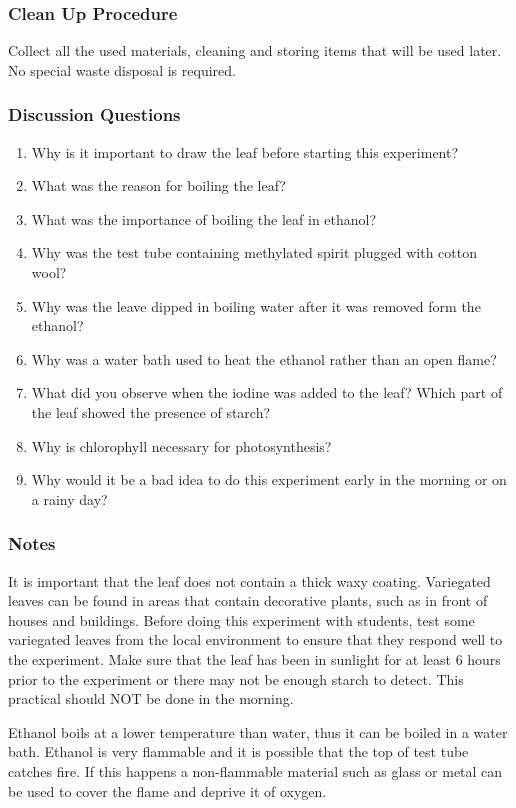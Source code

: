 \subsubsection*{Clean Up Procedure}
Collect all the used materials, cleaning and storing items that will be used later. No special waste disposal is required.

\subsubsection*{Discussion Questions}
\begin{enumerate}
\item{Why is it important to draw the leaf before starting this experiment?}
\item{What was the reason for boiling the leaf?}
\item{What was the importance of boiling the leaf in ethanol?}
\item{Why was the test tube containing methylated spirit plugged with cotton wool?}
\item{Why was the leave dipped in boiling water after it was removed form the ethanol?}
\item{Why was a water bath used to heat the ethanol rather than an open flame?}
\item{What did you observe when the iodine was added to the leaf? Which part of the leaf showed the presence of starch?}
\item{Why is chlorophyll necessary for photosynthesis?}
\item{Why would it be a bad idea to do this experiment early in the morning or on a rainy day?}
\end{enumerate}

\subsubsection*{Notes}
It is important that the leaf does not contain a thick waxy coating. Variegated leaves can be found in areas that contain decorative plants, such as in front of houses and buildings. Before doing this experiment with students, test some variegated leaves from the local environment to ensure that they respond well to the experiment. Make sure that the leaf has been in sunlight for at least 6 hours prior to the experiment or there may not be enough starch to detect. This practical should NOT be done in the morning.

Ethanol boils at a lower temperature than water, thus it can be boiled in a water bath. Ethanol is very flammable and it is possible that the top of test tube catches fire. If this happens a non-flammable material such as glass or metal can be used to cover the flame and deprive it of oxygen.

